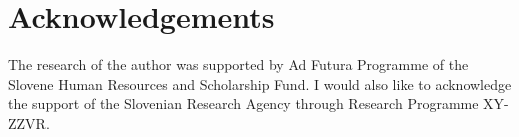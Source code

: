 \chapter{Acknowledgements}
The research of the author was supported by Ad Futura Programme of the Slovene Human Resources and Scholarship Fund. I would also like to acknowledge the support of the Slovenian Research Agency through Research Programme XY-ZZVR.  





